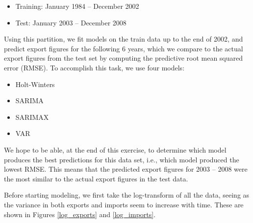 \documentclass[]{article}
\begin{document}
\begin{itemize}
\item Training: January 1984 -- December 2002
\item Test: January 2003 -- December 2008
\end{itemize}

Using this partition, we fit models on the train data up to the end of 2002, and predict export figures for the following 6 years, which we compare to the actual export figures from the test set by computing the predictive root mean squared error (RMSE). To accomplish this task, we use four models:

\begin{itemize}
\item Holt-Winters
\item SARIMA
\item SARIMAX
\item VAR
\end{itemize}

We hope to be able, at the end of this exercise, to determine which model produces the best predictions for this data set, i.e., which model produced the lowest RMSE. This means that the predicted export figures for 2003 -- 2008 were the most similar to the actual export figures in the test data.

Before starting modeling, we first take the log-transform of all the data, seeing as the variance in both exports and imports seem to increase with time. These are shown in Figures \ref{log_exports} and \ref{log_imports}.
\end{document}
